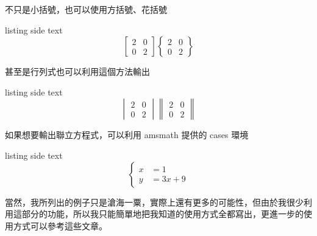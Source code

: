 不只是小括號，也可以使用方括號、花括號

\begin{tcblisting}{listing side text}
\[
\begin{bmatrix}
2 & 0\\
0 & 2
\end{bmatrix}
\begin{Bmatrix}
2 & 0\\
0 & 2
\end{Bmatrix}
\]
\end{tcblisting}

甚至是行列式也可以利用這個方法輸出

\begin{tcblisting}{listing side text}
\[
\begin{vmatrix}
2 & 0\\
0 & 2
\end{vmatrix}
\begin{Vmatrix}
2 & 0\\
0 & 2
\end{Vmatrix}
\]
\end{tcblisting}

如果想要輸出聯立方程式，可以利用 amsmath 提供的 cases 環境

\begin{tcblisting}{listing side text}
\[
\begin{cases}
x &= 1\\
y &= 3x + 9
\end{cases}
\]
\end{tcblisting}

當然，我所列出的例子只是滄海一粟，實際上還有更多的可能性，但由於我很少利用這部分的功能，所以我只能簡單地把我知道的使用方式全都寫出，更進一步的使用方式可以參考這些文章。